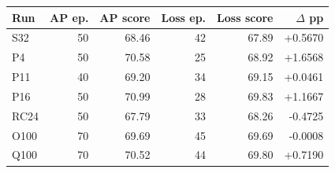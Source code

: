\begin{tabular}{lrrrrr}
\toprule
Run & AP ep. & AP score & Loss ep. & Loss score & $\Delta$ pp \\
\midrule
S32 & 50 & 68.46 & 42 & 67.89 & +0.5670 \\
P4 & 50 & 70.58 & 25 & 68.92 & +1.6568 \\
P11 & 40 & 69.20 & 34 & 69.15 & +0.0461 \\
P16 & 50 & 70.99 & 28 & 69.83 & +1.1667 \\
RC24 & 50 & 67.79 & 33 & 68.26 & -0.4725 \\
O100 & 70 & 69.69 & 45 & 69.69 & -0.0008 \\
Q100 & 70 & 70.52 & 44 & 69.80 & +0.7190 \\
\bottomrule
\end{tabular}
